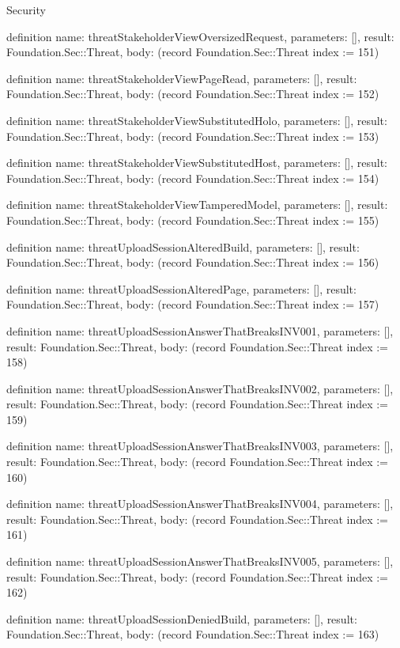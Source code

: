 \begin{lexlean}{Security}
\begin{semanticmodule}
definition{
  name: threatStakeholderViewOversizedRequest,
  parameters: [],
  result: Foundation.Sec::Threat,
  body: (record Foundation.Sec::Threat {index := 151})
}

definition{
  name: threatStakeholderViewPageRead,
  parameters: [],
  result: Foundation.Sec::Threat,
  body: (record Foundation.Sec::Threat {index := 152})
}

definition{
  name: threatStakeholderViewSubstitutedHolo,
  parameters: [],
  result: Foundation.Sec::Threat,
  body: (record Foundation.Sec::Threat {index := 153})
}

definition{
  name: threatStakeholderViewSubstitutedHost,
  parameters: [],
  result: Foundation.Sec::Threat,
  body: (record Foundation.Sec::Threat {index := 154})
}

definition{
  name: threatStakeholderViewTamperedModel,
  parameters: [],
  result: Foundation.Sec::Threat,
  body: (record Foundation.Sec::Threat {index := 155})
}

definition{
  name: threatUploadSessionAlteredBuild,
  parameters: [],
  result: Foundation.Sec::Threat,
  body: (record Foundation.Sec::Threat {index := 156})
}

definition{
  name: threatUploadSessionAlteredPage,
  parameters: [],
  result: Foundation.Sec::Threat,
  body: (record Foundation.Sec::Threat {index := 157})
}

definition{
  name: threatUploadSessionAnswerThatBreaksINV001,
  parameters: [],
  result: Foundation.Sec::Threat,
  body: (record Foundation.Sec::Threat {index := 158})
}

definition{
  name: threatUploadSessionAnswerThatBreaksINV002,
  parameters: [],
  result: Foundation.Sec::Threat,
  body: (record Foundation.Sec::Threat {index := 159})
}

definition{
  name: threatUploadSessionAnswerThatBreaksINV003,
  parameters: [],
  result: Foundation.Sec::Threat,
  body: (record Foundation.Sec::Threat {index := 160})
}

definition{
  name: threatUploadSessionAnswerThatBreaksINV004,
  parameters: [],
  result: Foundation.Sec::Threat,
  body: (record Foundation.Sec::Threat {index := 161})
}

definition{
  name: threatUploadSessionAnswerThatBreaksINV005,
  parameters: [],
  result: Foundation.Sec::Threat,
  body: (record Foundation.Sec::Threat {index := 162})
}

definition{
  name: threatUploadSessionDeniedBuild,
  parameters: [],
  result: Foundation.Sec::Threat,
  body: (record Foundation.Sec::Threat {index := 163})
}


\end{semanticmodule}
\end{lexlean}
